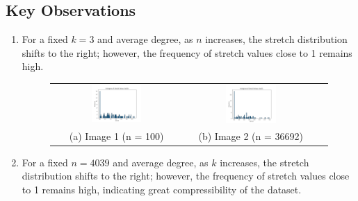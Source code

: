 \documentclass{article}
\begin{document}
\subsection*{Key Observations}

\begin{enumerate}
    \item For a fixed $k=3$ and average degree, as $n$ increases, the stretch distribution shifts to the right; however, the frequency of stretch values close to 1 remains high.

    \begin{figure}[H]
        \centering
        \begin{tabular}{ccc}
            \includegraphics[width=0.4\textwidth]{img/test16.png} &
            \includegraphics[width=0.4\textwidth]{img/test11.png} \\
            (a) Image 1 (n = 100) & (b) Image 2 (n = 36692)\\
        \end{tabular}
        \label{fig:three_images}
    \end{figure}

    \item For a fixed $n=4039$ and average degree, as $k$ increases, the stretch distribution shifts to the right; however, the frequency of stretch values close to 1 remains high, indicating great compressibility of the dataset.


\end{enumerate}
\end{document}
